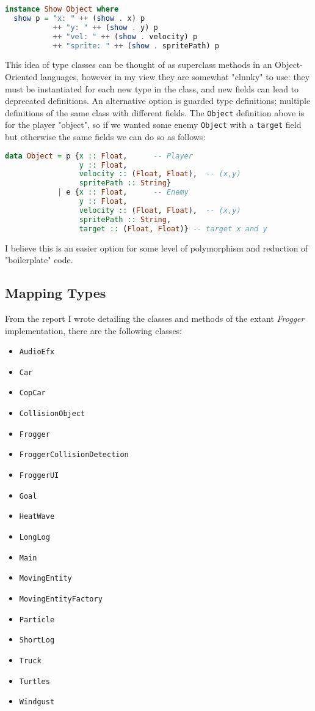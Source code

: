 \documentclass[12pt, a4paper]{report}
\begin{document}
\begin{lstlisting}[language=Haskell]
instance Show Object where
  show p = "x: " ++ (show . x) p
           ++ "y: " ++ (show . y) p
           ++ "vel: " ++ (show . velocity) p
           ++ "sprite: " ++ (show . spritePath) p
\end{lstlisting}

This idea of type classes can be thought of as superclass methods in an Object-Oriented languages, however in my view they are somewhat "clunky" to use: they must be instantiated for each new type in the class, and new fields can lead to deprecated definitions.
An alternative option is guarded type definitions; multiple definitions of the same class with different fields.
The \verb|Object| definition above is for the player "object", so if we wanted some enemy \verb|Object| with a \verb|target| field but otherwise the same fields we can do so as follows:

\begin{lstlisting}[language=Haskell]
data Object = p {x :: Float,      -- Player
                 y :: Float,
                 velocity :: (Float, Float),  -- (x,y)
                 spritePath :: String}
            | e {x :: Float,      -- Enemy
                 y :: Float,
                 velocity :: (Float, Float),  -- (x,y)
                 spritePath :: String,
                 target :: (Float, Float)} -- target x and y
\end{lstlisting}

I believe this is an easier option for some level of polymorphism and reduction of "boilerplate" code.

\subsection{Mapping Types}
From the report I wrote detailing the classes and methods of the extant \textit{Frogger} implementation, there are the following classes:
\begin{itemize}
  \item \verb|AudioEfx|
  \item \verb|Car|
  \item \verb|CopCar|
  \item \verb|CollisionObject|
  \item \verb|Frogger|
  \item \verb|FroggerCollisionDetection|
  \item \verb|FroggerUI|
  \item \verb|Goal|
  \item \verb|HeatWave|
  \item \verb|LongLog|
  \item \verb|Main|
  \item \verb|MovingEntity|
  \item \verb|MovingEntityFactory|
  \item \verb|Particle|
  \item \verb|ShortLog|
  \item \verb|Truck|
  \item \verb|Turtles|
  \item \verb|Windgust|
\end{itemize}
\end{document}
